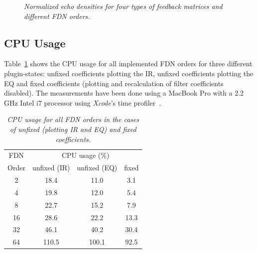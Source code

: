 \documentclass[twoside,a4paper]{article}
\begin{document}
\begin{figure}[ht!]
     \hfill
    \caption{\textit{Normalized echo densities for four types of feedback matrices and different FDN orders.}}
    \label{fig:echo}
\end{figure}

\subsection{CPU Usage}\label{sec:CPU}
Table~\ref{tab:CPU} shows the CPU usage for all implemented FDN orders for three different plugin-states: unfixed coefficients plotting the IR, unfixed coefficients plotting the EQ and fixed coefficients (plotting and recalculation of filter coefficients disabled). The measurements have been done using a MacBook Pro with a 2.2\,GHz Intel i7 processor using \textit{Xcode}'s time profiler~\cite{Xcode}.

\begin{table}[t!]
    \caption{\textit{CPU usage for all FDN orders in the cases of unfixed (plotting IR and EQ) and fixed coefficients.}}
    \centering
    \begin{tabular}{|c|c|c|c|}
    \hline
      FDN & \multicolumn{3}{|c|}{CPU usage (\%)} \\\cline{2-4}
      Order & unfixed (IR) & unfixed (EQ) & fixed \\
       \hline
       2 & 18.4 & 11.0 & 3.1\\
       4 & 19.8 & 12.0 & 5.4 \\
       8 & 22.7 & 15.2 & 7.9 \\
       16 & 28.6 & 22.2 & 13.3\\
       32 & 46.1 & 40.2 & 30.4\\
       64 & 110.5 & 100.1 & 92.5\\
         \hline
    \end{tabular}
    \label{tab:CPU}
\end{table}
\end{document}
